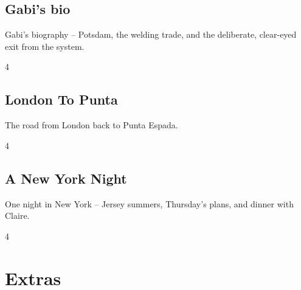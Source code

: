 \documentclass[a4paper,landscape]{memoir}
\begin{document}
\chapter{Gabi's bio}
Gabi's biography -- Potsdam, the welding trade, and the deliberate, clear-eyed exit from the system.
\clearpage\begin{multicols*}{4}

















\end{multicols*}

\chapter{London To Punta}
The road from London back to Punta Espada.
\clearpage\begin{multicols*}{4}



\end{multicols*}

\chapter{A New York Night}
One night in New York -- Jersey summers, Thursday's plans, and dinner with Claire.
\clearpage\begin{multicols*}{4} %








\end{multicols*}

\part{Extras}
\end{document}
